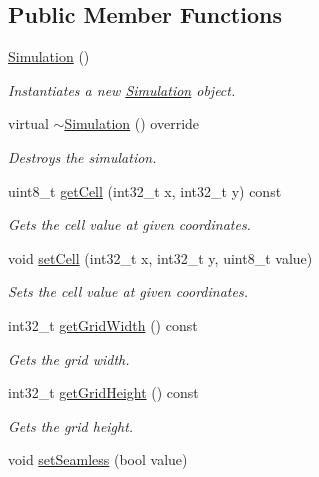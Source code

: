\subsection*{Public Member Functions}
\begin{DoxyCompactItemize}
\item 
\mbox{\hyperlink{class_simulation_a5b224cc5b36bcc8eb29689aff223de41}{Simulation}} ()
\begin{DoxyCompactList}\small\item\em Instantiates a new \mbox{\hyperlink{class_simulation}{Simulation}} object. \end{DoxyCompactList}\item 
virtual \mbox{\hyperlink{class_simulation_a70bcf076c771e7f87accb5194a29c2de}{$\sim$\+Simulation}} () override
\begin{DoxyCompactList}\small\item\em Destroys the simulation. \end{DoxyCompactList}\item 
uint8\+\_\+t \mbox{\hyperlink{class_simulation_a3e8280ed7e9e198b1cd0e971f203d735}{get\+Cell}} (int32\+\_\+t x, int32\+\_\+t y) const
\begin{DoxyCompactList}\small\item\em Gets the cell value at given coordinates. \end{DoxyCompactList}\item 
void \mbox{\hyperlink{class_simulation_a8e46c18b9c2d57bf10f639aa676bb936}{set\+Cell}} (int32\+\_\+t x, int32\+\_\+t y, uint8\+\_\+t value)
\begin{DoxyCompactList}\small\item\em Sets the cell value at given coordinates. \end{DoxyCompactList}\item 
int32\+\_\+t \mbox{\hyperlink{class_simulation_a407aec90b481c057000ac432594eb4f9}{get\+Grid\+Width}} () const
\begin{DoxyCompactList}\small\item\em Gets the grid width. \end{DoxyCompactList}\item 
int32\+\_\+t \mbox{\hyperlink{class_simulation_a30517d33e61a6b54515de81cdcc4039f}{get\+Grid\+Height}} () const
\begin{DoxyCompactList}\small\item\em Gets the grid height. \end{DoxyCompactList}\item 
void \mbox{\hyperlink{class_simulation_ab5f84974ddbb9113f385d7bc03f794ed}{set\+Seamless}} (bool value)

\end{DoxyCompactItemize}
